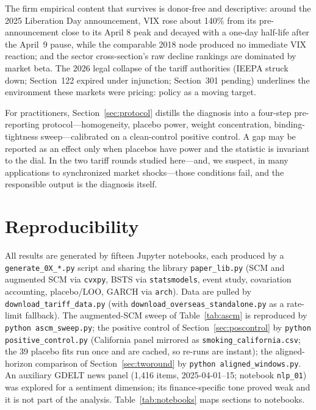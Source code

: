 \documentclass[11pt,a4paper]{article}
\begin{document}
The firm empirical content that survives is donor-free and descriptive:
around the 2025 Liberation Day announcement, VIX rose about 140\% from
its pre-announcement close to its April 8 peak and decayed with a
one-day half-life after the April~9 pause,
while the comparable 2018 node produced no immediate VIX reaction; and
the sector cross-section's raw decline rankings are dominated by market
beta. The 2026 legal collapse of the tariff authorities (IEEPA struck
down; Section~122 expired under injunction; Section~301 pending)
underlines the environment these markets were pricing: policy as a
moving target.

For practitioners, Section~\ref{sec:protocol} distills the diagnosis into
a four-step pre-reporting protocol---homogeneity, placebo power, weight
concentration, binding-tightness sweep---calibrated on a clean-control
positive control. A gap may be reported as an effect only when placebos
have power and the statistic is invariant to the dial. In the two tariff
rounds studied here---and, we suspect, in many applications to
synchronized market shocks---those conditions fail, and the responsible
output is the diagnosis itself.




\appendix
\section{Reproducibility}\label{app:repro}

All results are generated by fifteen Jupyter notebooks, each produced by a
\texttt{generate\_0X\_*.py} script and sharing the library
\texttt{paper\_lib.py} (SCM and augmented SCM via \texttt{cvxpy}, BSTS via
\texttt{statsmodels}, event study, covariation accounting, placebo/LOO,
GARCH via \texttt{arch}). Data are pulled by
\texttt{download\_tariff\_data.py} (with
\texttt{download\_overseas\_standalone.py} as a rate-limit fallback). The
augmented-SCM sweep of Table~\ref{tab:ascm} is reproduced by
\texttt{python ascm\_sweep.py}; the positive control of
Section~\ref{sec:poscontrol} by \texttt{python positive\_control.py}
(California panel mirrored as \texttt{smoking\_california.csv}; the 39
placebo fits run once and are cached, so re-runs are instant); the
aligned-horizon comparison of Section~\ref{sec:tworound} by
\texttt{python aligned\_windows.py}. An
auxiliary GDELT news panel (1{,}416
items, 2025-04-01--15; notebook \texttt{nlp\_01}) was explored for a
sentiment dimension; its finance-specific tone proved weak and it is not
part of the analysis. Table~\ref{tab:notebooks} maps sections to
notebooks.
\end{document}
